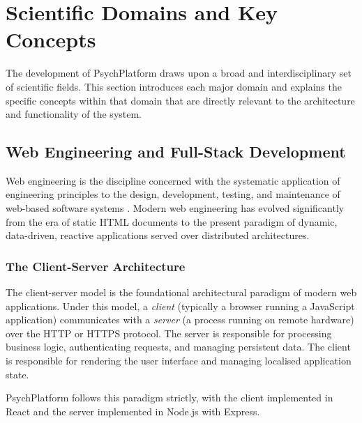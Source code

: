 \section{Scientific Domains and Key Concepts}
\label{sec:domains}

The development of PsychPlatform draws upon a broad and interdisciplinary set of
scientific fields. This section introduces each major domain and explains the
specific concepts within that domain that are directly relevant to the
architecture and functionality of the system.

\subsection{Web Engineering and Full-Stack Development}
\label{subsec:web-eng}

Web engineering is the discipline concerned with the systematic application of
engineering principles to the design, development, testing, and maintenance of
web-based software systems \cite{Murugesan2001}. Modern web engineering has
evolved significantly from the era of static HTML documents to the present
paradigm of dynamic, data-driven, reactive applications served over distributed
architectures.

\subsubsection{The Client-Server Architecture}

The client-server model is the foundational architectural paradigm of modern web
applications. Under this model, a \emph{client} (typically a browser running a
JavaScript application) communicates with a \emph{server} (a process running on
remote hardware) over the HTTP or HTTPS protocol. The server is responsible for
processing business logic, authenticating requests, and managing persistent data.
The client is responsible for rendering the user interface and managing localised
application state.

PsychPlatform follows this paradigm strictly, with the client implemented in
React and the server implemented in Node.js with Express.

